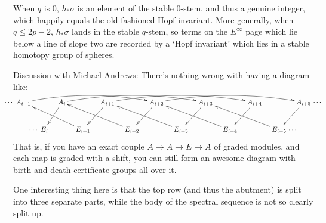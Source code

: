 \documentclass[11pt]{article}
\begin{document}
When $q$ is $0$, $h_*\sigma$ is an element of the stable $0$-stem, and thus a genuine integer, which happily equals the old-fashioned Hopf invariant. More generally, when $q\leq 2p-2$, $h_*\sigma$ lands in the stable $q$-stem, so terms on the $E^\infty$ page which lie below a line of slope two are recorded by a `Hopf invariant' which lies in a stable homotopy group of spheres.

{\color{red}Discussion with Michael Andrews:}
There's nothing wrong with having a diagram like:
\[\xymatrix@C=.3cm{
\makebox[0cm][r]{$\cdots$\ }
A_{i-1}\ar@/^1em/[rrrrrr]&&
A_{i  }\ar@/^1em/[rrrrrr]\ar[dl]&&
A_{i+1}\ar@/^1em/[rrrrrr]\ar[ld]&&
A_{i+2}\ar@/^1em/[rrrrrr]\ar[ld]&&
A_{i+3}\ar[ld]&&
A_{i+4}\ar[ld]&&
A_{i+5}\ar[dl]\makebox[0cm][l]{\ $\cdots$}\\
&
\makebox[0cm][r]{$\cdots$\ }
E_{i  }&&
E_{i+1}\ar[lllu]&&
E_{i+2}\ar[lllu]&&
E_{i+3}\ar[lllu]&&
E_{i+4}\ar[lllu]&&
E_{i+5}\ar[lllu]\makebox[0cm][l]{\ $\cdots$}
}\]
That is, if you have an exact couple $A\to A\to E\to A$ of graded modules, and
each map is graded with a shift, you can still form an awesome diagram with
birth and death certificate groups all over it.

One interesting thing here is that the top row (and thus the abutment) is split
into three separate parts, while the body of the spectral sequence is not so
clearly split up.
\end{document}

